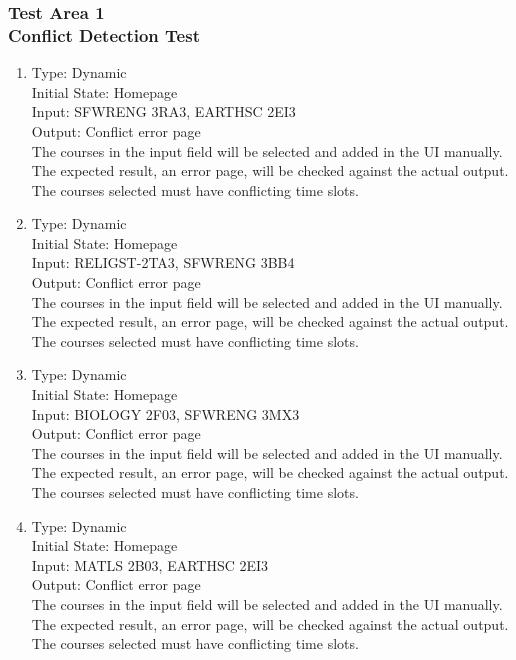 \documentclass[11pt, oneside]{article}   	%
\begin{document}
\subsubsection{Test Area 1 \\ Conflict Detection Test}
\begin{enumerate}
\item Type: Dynamic \\
Initial State: Homepage \\
Input: SFWRENG 3RA3, EARTHSC 2EI3 \\
Output: Conflict error page \\
The courses in the input field will be selected and added in the UI manually. The expected result, an error page, will be checked against the actual output. The courses selected must have conflicting time slots. \\

\item Type: Dynamic \\
Initial State: Homepage \\
Input: RELIGST-2TA3, SFWRENG 3BB4 \\
Output: Conflict error page \\
The courses in the input field will be selected and added in the UI manually. The expected result, an error page, will be checked against the actual output. The courses selected must have conflicting time slots. \\


\item Type: Dynamic \\
Initial State: Homepage \\
Input: BIOLOGY 2F03, SFWRENG 3MX3 \\
Output: Conflict error page \\
The courses in the input field will be selected and added in the UI manually. The expected result, an error page, will be checked against the actual output. The courses selected must have conflicting time slots. \\


\item Type: Dynamic \\
Initial State: Homepage \\
Input: MATLS 2B03, EARTHSC 2EI3 \\
Output: Conflict error page \\
The courses in the input field will be selected and added in the UI manually. The expected result, an error page, will be checked against the actual output. The courses selected must have conflicting time slots. \\
\end{enumerate}
\end{document}
